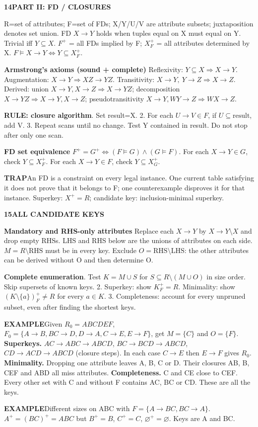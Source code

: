 \documentclass[a4paper]{article}
\newcommand{\bodyfontsize}{5.55}
\newcommand{\bodyleading}{5.3}
\newcommand{\codefontsize}{5.05}
\newcommand{\codeleading}{5.0}
\newcommand{\bodylineskiplimit}{-2pt}
\newcommand{\bodystyle}{%
  \fontsize{\bodyfontsize}{\bodyleading}\selectfont\setlength{\lineskiplimit}{\bodylineskiplimit}\RaggedRight
  \setlength{\abovedisplayskip}{.5pt}\setlength{\belowdisplayskip}{.5pt}%
  \setlength{\abovedisplayshortskip}{.3pt}\setlength{\belowdisplayshortskip}{.3pt}}
\newcommand{\topic}[2]{\par\addvspace{.45pt}\nointerlineskip%
  \begingroup\setlength{\fboxsep}{0.35pt}%
  \noindent\colorbox{structure}{\parbox{\dimexpr\linewidth-2\fboxsep\relax}{%
    \color{white}\fontsize{6.45}{6.8}\selectfont\bfseries #1\enspace #2}}%
  \endgroup\par\nobreak\vspace{.55pt}\nointerlineskip\nobreak}
\newenvironment{topicblock}
  {\par\bodystyle}
  {\par}
\newcommand{\key}[1]{\par\textcolor{structure}{\textbf{#1}}\enspace}
\newcommand{\note}[4]{\par\nointerlineskip\vspace{.25pt}\begingroup\setlength{\fboxsep}{0.1pt}%
  \noindent\colorbox{#1}{\parbox{\dimexpr\linewidth-2\fboxsep\relax}{%
    \RaggedRight\textcolor{#2}{\textbf{#3}}\enspace #4}}%
  \endgroup\par\nointerlineskip\vspace{.25pt}}
\newcommand{\trap}[1]{\note{warningbg}{warning}{TRAP}{#1}}
\newcommand{\ex}[1]{\note{examplebg}{example}{EXAMPLE}{#1}}
\newlength{\sheetwidth}
\newenvironment{sheetcolumns}[1]
  {\noindent\begin{minipage}[t]{#1\sheetwidth}\vspace{0pt}\bodystyle\ignorespaces}
  {\end{minipage}\par}
\begin{document}
\newpage
\renewcommand{\bodyfontsize}{5.80}
\renewcommand{\bodyleading}{5.3}
\renewcommand{\codefontsize}{5.15}
\renewcommand{\codeleading}{5.0}
\renewcommand{\bodylineskiplimit}{-1.5pt}
\begin{sheetcolumns}{.267}
\begin{topicblock}
\topic{14}{PART II: FD / CLOSURES}
R=set of attributes; F=set of FDs; X/Y/U/V are attribute subsets; juxtaposition denotes set union.
FD $X\to Y$ holds when tuples equal on X must equal on Y. Trivial iff $Y\subseteq X$. $F^+$ = all FDs implied by F; $X_F^+$ = all attributes determined by X. $F\models X\to Y\iff Y\subseteq X_F^+$.
\key{Armstrong's axioms (sound + complete)}
Reflexivity: $Y\subseteq X\Rightarrow X\to Y$.
Augmentation: $X\to Y\Rightarrow XZ\to YZ$.
Transitivity: $X\to Y,\ Y\to Z\Rightarrow X\to Z$.
Derived: union $X\to Y, X\to Z\Rightarrow X\to YZ$;
decomposition $X\to YZ\Rightarrow X\to Y,X\to Z$;
pseudotransitivity $X\to Y,WY\to Z\Rightarrow WX\to Z$.
\key{RULE: closure algorithm}
1. Set result=X. 2. For each $U\to V\in F$, if $U\subseteq\mathrm{result}$, add V. 3. Repeat scans until no change. Test Y contained in result. Do not stop after only one scan.
\key{FD set equivalence}
\mbox{$F^+=G^+\iff (F\models G)\land(G\models F)$.}
For each $X\to Y\in G$, check $Y\subseteq X_F^+$. For each $X\to Y\in F$, check $Y\subseteq X_G^+$.
\trap{An FD is a constraint on every legal instance. One current table satisfying it does not prove that it belongs to F; one counterexample disproves it for that instance. Superkey: $X^+=R$; candidate key: inclusion-minimal superkey.}
\end{topicblock}

\begin{topicblock}
\topic{15}{ALL CANDIDATE KEYS}
\key{Mandatory and RHS-only attributes}
Replace each $X\to Y$ by $X\to Y\setminus X$ and drop empty RHSs. LHS and RHS below are the unions of attributes on each side.
$M=R\setminus\mathrm{RHS}$ must be in every key. Exclude $O=\mathrm{RHS}\setminus\mathrm{LHS}$: the other attributes can be derived without O and then determine O.
\key{Complete enumeration}
1. Test $K=M\cup S$ for $S\subseteq R\setminus(M\cup O)$ in size order. Skip supersets of known keys.
2. Superkey: show $K_F^+=R$. Minimality: show $(K\setminus\{a\})_F^+\ne R$ for every $a\in K$.
3. Completeness: account for every unpruned subset, even after finding the shortest keys.
\ex{Given $R_0=ABCDEF$, $F_0=\{A\to B,BC\to D,D\to A,C\to E,E\to F\}$, get $M=\{C\}$ and $O=\{F\}$.
\textbf{Superkeys.} $AC\to ABC\to ABCD$,
$BC\to BCD\to ABCD$,
$CD\to ACD\to ABCD$ (closure steps). In each case $C\to E$ then $E\to F$ gives $R_0$.
\textbf{Minimality.} Dropping one attribute leaves A, B, C or D. Their closures AB, B, CEF and ABD all miss attributes.
\textbf{Completeness.} C and CE close to CEF. Every other set with C and without F contains AC, BC or CD. These are all the keys.}
\ex{Different sizes on ABC with $F=\{A\to BC,BC\to A\}$. $A^+=(BC)^+=ABC$ but $B^+=B$, $C^+=C$, $\varnothing^+=\varnothing$. Keys are A and BC.}
\end{topicblock}


\end{sheetcolumns}
\end{document}
